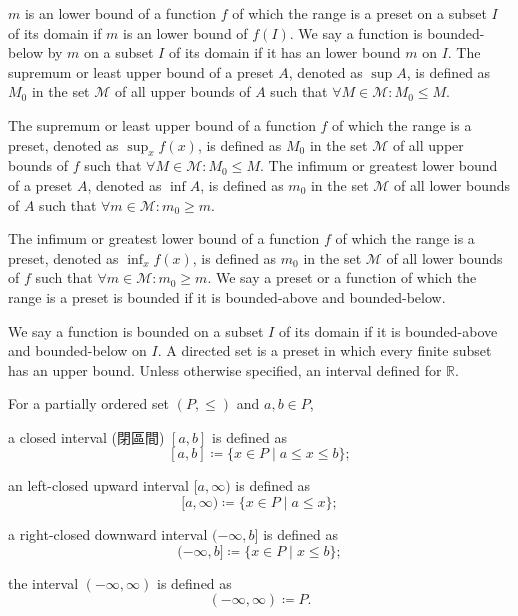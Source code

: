 \documentclass[a4paper,12pt]{article}
\begin{document}
{{{$m$ is an lower bound of a function $f$ of which the range is a preset on a subset $I$ of its domain if $m$ is an lower bound of $f(I)$. We say a function is bounded-below by $m$ on a subset $I$ of its domain if it has an lower bound $m$ on $I$.
The supremum or least upper bound of a preset $A$, denoted as $\sup A$, is defined as $M_0$ in the set $\mathcal{M}$ of all upper bounds of $A$ such that $\forall M\in\mathcal{M}\colon M_0\leq M$.

The supremum or least upper bound of a function $f$ of which the range is a preset, denoted as $\sup_xf(x)$, is defined as $M_0$ in the set $\mathcal{M}$ of all upper bounds of $f$ such that $\forall M\in\mathcal{M}\colon M_0\leq M$.
The infimum or greatest lower bound of a preset $A$, denoted as $\inf A$, is defined as $m_0$ in the set $\mathcal{M}$ of all lower bounds of $A$ such that $\forall m\in\mathcal{M}\colon m_0\geq m$.

The infimum or greatest lower bound of a function $f$ of which the range is a preset, denoted as $\inf_xf(x)$, is defined as $m_0$ in the set $\mathcal{M}$ of all lower bounds of $f$ such that $\forall m\in\mathcal{M}\colon m_0\geq m$.
We say a preset or a function of which the range is a preset is bounded if it is bounded-above and bounded-below.

We say a function is bounded on a subset $I$ of its domain if it is bounded-above and bounded-below on $I$.
A directed set is a preset in which every finite subset has an upper bound.
Unless otherwise specified, an interval defined for $\mathbb{R}$.

For a partially ordered set $(P,\leq)$ and $a,b\in P$, 
\bit
\item a closed interval (閉區間) $[a,b]$ is defined as
\[[a,b]\coloneq\{x\in P\mid a\leq x\leq b\};\]
\item an left-closed upward interval $[a,\infty)$ is defined as
\[[a,\infty)\coloneq\{x\in P\mid a\leq x\};\]
\item a right-closed downward interval $(-\infty,b]$ is defined as
\[(-\infty,b]\coloneq\{x\in P\mid x\leq b\};\]
\item the interval $(-\infty,\infty)$ is defined as
\[(-\infty,\infty)\coloneq P.\]
\eit

}}}
\end{document}
